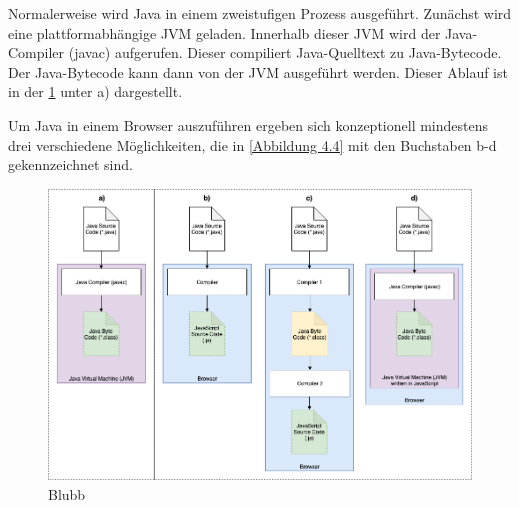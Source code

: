 Normalerweise wird Java in einem zweistufigen Prozess ausgeführt. Zunächst wird eine plattformabhängige JVM geladen. Innerhalb dieser JVM wird der Java-Compiler (javac) aufgerufen. Dieser compiliert Java-Quelltext zu Java-Bytecode. Der Java-Bytecode kann dann von der JVM ausgeführt werden. Dieser Ablauf ist in der \ref{abb:java_execution} unter a) dargestellt.

Um Java in einem Browser auszuführen ergeben sich konzeptionell mindestens drei verschiedene Möglichkeiten, die in \ref{Abbildung 4.4} mit den Buchstaben b-d gekennzeichnet sind.

\begin{figure}[H]
    \includegraphics[width=14cm]{chapter/entwurf/bilder/Java_JavaScript_Execution.png}
    \centering
    \caption{Blubb}
    \label{abb:java_execution}
\end{figure}

